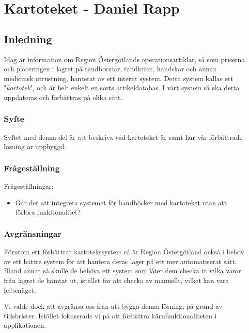 \section{Kartoteket - Daniel Rapp}
\subsection{Inledning}
Idag är information om Region Östergötlands operationsartiklar, så som priserna och
placeringen i lagret på tandborstar, tandkräm, handskar och annan
medicinsk utrustning, hanterat av ett internt system.
Detta system kallas ett "\textit{kartotek}", och är helt enkelt en sorts artikeldatabas.
I vårt system så ska detta uppdateras och förbättras på olika sätt.

\subsubsection{Syfte}
Syftet med denna del är att beskriva vad kartoteket är samt
hur vår förbättrade lösning är uppbyggd.


\subsubsection{Frågeställning}
Frågeställningar:
\begin{itemize}
  \item Går det att integrera systemet för handböcker med kartoteket utan att förlora funktionalitet?
\end{itemize}


\subsubsection{Avgränsningar}
Förutom ett förbättrat kartotekssystem så är Region Östergötland också i behov av
ett bättre system för att hantera deras lager på ett mer automatiserat sätt.
Bland annat så skulle de behöva ett system som låter dem checka in vilka varor från lagret de hämtat
ut, istället för att checka av manuellt, vilket kan vara felbenäget.

Vi valde dock att avgränsa oss från att bygga denna lösning, på grund av tidsbrister.
Istället fokuserade vi på att förbättra kärnfunktionaliteten i applikationen.


\clearpage
